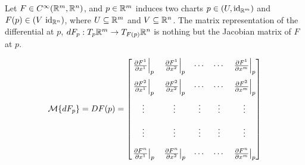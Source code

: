 \documentclass[../main-manifolds.tex]{subfiles}
\begin{document}
\begin{definition}
Let $F\in \cinf[\realm,\realn]$, and $p\in{\mathbb{R}^m}$ induces two charts $p\in (U,\operatorname{id}_{{\mathbb{R}^m}})$ and $F(p)\in(V\,\operatorname{id}_{{\mathbb{R}^n}})$, where $U\subseteq{\mathbb{R}^m}$ and $V\subseteq{\mathbb{R}^n}$. The matrix representation of the differential at $p$, $dF_p: T_p{\mathbb{R}^m}\to T_{F(p)}{\mathbb{R}^n}$ is nothing but the Jacobian matrix of $F$ at $p$.

\begin{equation}\label{lee-chap3:euclidean-differential-jacobian}
    \mcal\{dF_p\} = DF(p) = \begin{bmatrix}
        \eval{\pdv{F^1}{x^1}}_{p} & \eval{\pdv{F^1}{x^2}}_{p} & \cdots & \cdots & \eval{\pdv{F^1}{x^m}}_{p} \\[1em] \eval{\pdv{F^2}{x^1}}_{p} & \eval{\pdv{F^2}{x^2}}_{p} & \cdots & \cdots & \eval{\pdv{F^2}{x^m}}_{p} \\[1em] \vdots & \vdots & \vdots & \vdots & \vdots \\[1em] \vdots & \vdots & \vdots & \vdots & \vdots \\[1em] \eval{\pdv{F^n}{x^1}}_{p} & \eval{\pdv{F^n}{x^2}}_{p} & \cdots & \cdots & \eval{\pdv{F^n}{x^m}}_{p}
    \end{bmatrix}
\end{equation}

\end{definition}
\end{document}
